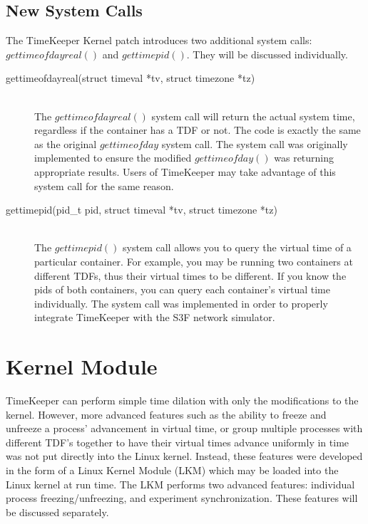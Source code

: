 \subsection{New System Calls}
\label{subsec:new_system_calls}
The TimeKeeper Kernel patch introduces two additional system calls: $gettimeofdayreal()$ and $gettimepid()$. They will be discussed individually. 
\begin{description} 
\item[gettimeofdayreal(struct timeval *tv, struct timezone *tz)] \hfill \\
The $gettimeofdayreal()$ system call will return the actual system time, regardless if the container has a TDF or not. The code is exactly the same as the original $gettimeofday$ system call. The system call was originally implemented to ensure the modified $gettimeofday()$ was returning appropriate results. Users of TimeKeeper may take advantage of this system call for the same reason.   
\item[gettimepid(pid\_t pid, struct timeval *tv, struct timezone *tz)] \hfill \\
The $gettimepid()$ system call allows you to query the virtual time of a particular container. For example, you may be running two containers at different TDFs, thus their virtual times to be different. If you know the pids of both containers, you can query each container's virtual time individually. The system call was implemented in order to properly integrate TimeKeeper with the S3F network simulator. 
\end{description}
\section{Kernel Module}
\label{sec:kernel_module}
        TimeKeeper can perform simple time dilation with only the modifications to the kernel. However, more advanced features such as the ability to freeze and unfreeze a process' advancement in virtual time, or group multiple processes with different TDF's together to have their virtual times advance uniformly in time was not put directly into the Linux kernel. Instead, these features were developed in the form of a Linux Kernel Module (LKM) which may be loaded into the Linux kernel at run time. The LKM performs two advanced features: individual process freezing/unfreezing, and experiment synchronization. These features will be discussed separately. 
